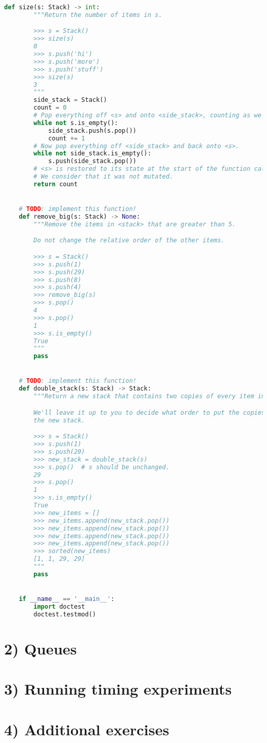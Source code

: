 \documentclass[12pt]{article}
\begin{document}
\begin{lstlisting}[language=Python,caption={mystack.py},captionpos=b]
    def size(s: Stack) -> int:
        """Return the number of items in s.

        >>> s = Stack()
        >>> size(s)
        0
        >>> s.push('hi')
        >>> s.push('more')
        >>> s.push('stuff')
        >>> size(s)
        3
        """
        side_stack = Stack()
        count = 0
        # Pop everything off <s> and onto <side_stack>, counting as we go.
        while not s.is_empty():
            side_stack.push(s.pop())
            count += 1
        # Now pop everything off <side_stack> and back onto <s>.
        while not side_stack.is_empty():
            s.push(side_stack.pop())
        # <s> is restored to its state at the start of the function call.
        # We consider that it was not mutated.
        return count


    # TODO: implement this function!
    def remove_big(s: Stack) -> None:
        """Remove the items in <stack> that are greater than 5.

        Do not change the relative order of the other items.

        >>> s = Stack()
        >>> s.push(1)
        >>> s.push(29)
        >>> s.push(8)
        >>> s.push(4)
        >>> remove_big(s)
        >>> s.pop()
        4
        >>> s.pop()
        1
        >>> s.is_empty()
        True
        """
        pass


    # TODO: implement this function!
    def double_stack(s: Stack) -> Stack:
        """Return a new stack that contains two copies of every item in <stack>.

        We'll leave it up to you to decide what order to put the copies into in
        the new stack.

        >>> s = Stack()
        >>> s.push(1)
        >>> s.push(29)
        >>> new_stack = double_stack(s)
        >>> s.pop()  # s should be unchanged.
        29
        >>> s.pop()
        1
        >>> s.is_empty()
        True
        >>> new_items = []
        >>> new_items.append(new_stack.pop())
        >>> new_items.append(new_stack.pop())
        >>> new_items.append(new_stack.pop())
        >>> new_items.append(new_stack.pop())
        >>> sorted(new_items)
        [1, 1, 29, 29]
        """
        pass


    if __name__ == '__main__':
        import doctest
        doctest.testmod()

\end{lstlisting}


\section*{2) Queues}

\section*{3) Running timing experiments}

\section*{4) Additional exercises}
\end{document}
